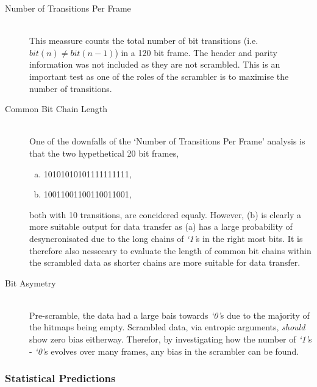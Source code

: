 			\begin{description}
				\item[Number of Transitions Per Frame] \hfill \\
					This meassure counts the total number of bit transitions (i.e. $bit(n) \neq bit(n-1)$) in a 120 bit frame. 
					The header and parity information was not included as they are not scrambled.
					This is an important test as one of the roles of the scrambler is to maximise the number of transitions.

				\item[Common Bit Chain Length] \hfill \\
					One of the downfalls of the `Number of Transitions Per Frame' analysis is that the two hypethetical 20 bit frames,

					\begin{enumerate}[a)]
						\item \textsc{10101010101111111111},
						\item \textsc{10011001100110011001},
					\end{enumerate}

					both with 10 transitions, are concidered equaly. However, (b) is clearly a more suitable output for data transfer as (a) has a large probability of desyncronisated due to the long chains of \textit{`1'}s in the right most bits.
					It is therefore also nessecary to evaluate the length of common bit chains within the scrambled data as shorter chains are more suitable for data transfer.

				\item[Bit Asymetry] \hfill \\
					Pre-scramble, the data had a large bais towards \textit{`0'}s due to the majority of the hitmaps being empty.
					Scrambled data, via entropic arguments, \textit{should} show zero bias eitherway.
					Therefor, by investigating how the number of \textit{`1'}s - \textit{`0'}s evolves over many frames, any bias in the scrambler can be found.

			\end{description}	

		\subsubsection{Statistical Predictions} %
		\label{subsub:statistical_predictions}

